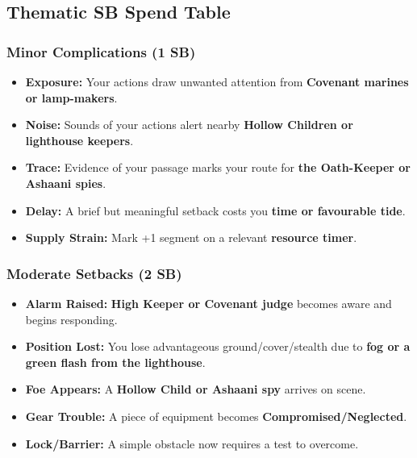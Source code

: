 \subsection*{Thematic SB Spend Table}
\label{sec:galanina-sb}

\subsubsection*{Minor Complications (1 SB)}
\begin{itemize}
\item \textbf{Exposure:} Your actions draw unwanted attention from \textbf{Covenant marines or lamp-makers}.
\item \textbf{Noise:} Sounds of your actions alert nearby \textbf{Hollow Children or lighthouse keepers}.
\item \textbf{Trace:} Evidence of your passage marks your route for \textbf{the Oath-Keeper or Ashaani spies}.
\item \textbf{Delay:} A brief but meaningful setback costs you \textbf{time or favourable tide}.
\item \textbf{Supply Strain:} Mark +1 segment on a relevant \textbf{resource timer}.
\end{itemize}

\subsubsection*{Moderate Setbacks (2 SB)}
\begin{itemize}
\item \textbf{Alarm Raised:} \textbf{High Keeper or Covenant judge} becomes aware and begins responding.
\item \textbf{Position Lost:} You lose advantageous ground/cover/stealth due to \textbf{fog or a green flash from the lighthouse}.
\item \textbf{Foe Appears:} A \textbf{Hollow Child or Ashaani spy} arrives on scene.
\item \textbf{Gear Trouble:} A piece of equipment becomes \textbf{Compromised/Neglected}.
\item \textbf{Lock/Barrier:} A simple obstacle now requires a test to overcome.
\end{itemize}

